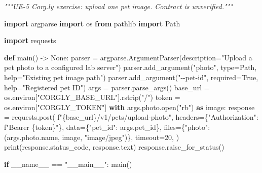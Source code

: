 \documentclass[
  mongolian,
]{article}
\newenvironment{Shaded}{}{}
\newcommand{\BuiltInTok}[1]{\textcolor[rgb]{0.00,0.50,0.00}{#1}}
\newcommand{\CommentTok}[1]{\textcolor[rgb]{0.38,0.63,0.69}{\textit{#1}}}
\newcommand{\ControlFlowTok}[1]{\textcolor[rgb]{0.00,0.44,0.13}{\textbf{#1}}}
\newcommand{\DecValTok}[1]{\textcolor[rgb]{0.25,0.63,0.44}{#1}}
\newcommand{\ImportTok}[1]{\textcolor[rgb]{0.00,0.50,0.00}{\textbf{#1}}}
\newcommand{\KeywordTok}[1]{\textcolor[rgb]{0.00,0.44,0.13}{\textbf{#1}}}
\newcommand{\NormalTok}[1]{#1}
\newcommand{\OperatorTok}[1]{\textcolor[rgb]{0.40,0.40,0.40}{#1}}
\newcommand{\SpecialCharTok}[1]{\textcolor[rgb]{0.25,0.44,0.63}{#1}}
\newcommand{\SpecialStringTok}[1]{\textcolor[rgb]{0.73,0.40,0.53}{#1}}
\newcommand{\StringTok}[1]{\textcolor[rgb]{0.25,0.44,0.63}{#1}}
\newcommand{\VariableTok}[1]{\textcolor[rgb]{0.10,0.09,0.49}{#1}}
\begin{document}
\begin{Shaded}
\begin{Highlighting}[]
\CommentTok{"""UE{-}5 Corg.ly exercise: upload one pet image. Contract is unverified."""}

\ImportTok{import}\NormalTok{ argparse}
\ImportTok{import}\NormalTok{ os}
\ImportTok{from}\NormalTok{ pathlib }\ImportTok{import}\NormalTok{ Path}

\ImportTok{import}\NormalTok{ requests}


\KeywordTok{def}\NormalTok{ main() }\OperatorTok{{-}\textgreater{}} \VariableTok{None}\NormalTok{:}
\NormalTok{    parser }\OperatorTok{=}\NormalTok{ argparse.ArgumentParser(description}\OperatorTok{=}\StringTok{"Upload a pet photo to a configured lab server"}\NormalTok{)}
\NormalTok{    parser.add\_argument(}\StringTok{"photo"}\NormalTok{, }\BuiltInTok{type}\OperatorTok{=}\NormalTok{Path, }\BuiltInTok{help}\OperatorTok{=}\StringTok{"Existing pet image path"}\NormalTok{)}
\NormalTok{    parser.add\_argument(}\StringTok{"{-}{-}pet{-}id"}\NormalTok{, required}\OperatorTok{=}\VariableTok{True}\NormalTok{, }\BuiltInTok{help}\OperatorTok{=}\StringTok{"Registered pet ID"}\NormalTok{)}
\NormalTok{    args }\OperatorTok{=}\NormalTok{ parser.parse\_args()}
\NormalTok{    base\_url }\OperatorTok{=}\NormalTok{ os.environ[}\StringTok{"CORGLY\_BASE\_URL"}\NormalTok{].rstrip(}\StringTok{"/"}\NormalTok{)}
\NormalTok{    token }\OperatorTok{=}\NormalTok{ os.environ[}\StringTok{"CORGLY\_TOKEN"}\NormalTok{]}
    \ControlFlowTok{with}\NormalTok{ args.photo.}\BuiltInTok{open}\NormalTok{(}\StringTok{"rb"}\NormalTok{) }\ImportTok{as}\NormalTok{ image:}
\NormalTok{        response }\OperatorTok{=}\NormalTok{ requests.post(}
            \SpecialStringTok{f"}\SpecialCharTok{\{}\NormalTok{base\_url}\SpecialCharTok{\}}\SpecialStringTok{/v1/pets/upload{-}photo"}\NormalTok{,}
\NormalTok{            headers}\OperatorTok{=}\NormalTok{\{}\StringTok{"Authorization"}\NormalTok{: }\SpecialStringTok{f"Bearer }\SpecialCharTok{\{}\NormalTok{token}\SpecialCharTok{\}}\SpecialStringTok{"}\NormalTok{\},}
\NormalTok{            data}\OperatorTok{=}\NormalTok{\{}\StringTok{"pet\_id"}\NormalTok{: args.pet\_id\},}
\NormalTok{            files}\OperatorTok{=}\NormalTok{\{}\StringTok{"photo"}\NormalTok{: (args.photo.name, image, }\StringTok{"image/jpeg"}\NormalTok{)\},}
\NormalTok{            timeout}\OperatorTok{=}\DecValTok{20}\NormalTok{,}
\NormalTok{        )}
    \BuiltInTok{print}\NormalTok{(response.status\_code, response.text)}
\NormalTok{    response.raise\_for\_status()}


\ControlFlowTok{if} \VariableTok{\_\_name\_\_} \OperatorTok{==} \StringTok{"\_\_main\_\_"}\NormalTok{:}
\NormalTok{    main()}
\end{Highlighting}
\end{Shaded}
\end{document}
